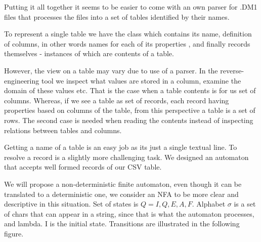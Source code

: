 Putting it all together it seems to be easier to come with an own parser for .DM1 files that processes the files into a set of tables identified by their names. 

To represent a single table we have the class  which contains its name, definition of columns, in other words names for each of its properties , and finally records themselves - instances of  which are contents of a table.

However, the view on a table may vary due to use of a parser. In the reverse-engineering tool we inspect what values are stored in a column, examine the domain of these values etc. That is the case when a table contents is for us set of columns. Whereas, if we see a table as set of records, each record having properties based on columns of the table, from this perspective a table is a set of rows. The second case is needed when reading the contents instead of inspecting relations between tables and columns.

Getting a name of a table is an easy job as its just a single textual line. To resolve a record is a slightly more challenging task. We designed an automaton that accepts well formed records of our CSV table.

We will propose a non-deterministic finite automaton, even though it can be translated to a deterministic one, we consider an NFA to be more clear and descriptive in this situation.
Set of states is $Q = {I, Q, E, A, F}$.
Alphabet $\sigma$ is a set of chars that can appear in a string, since that is what the automaton processes, and lambda.
I is the initial state.
Transitions are illustrated in the following figure.

